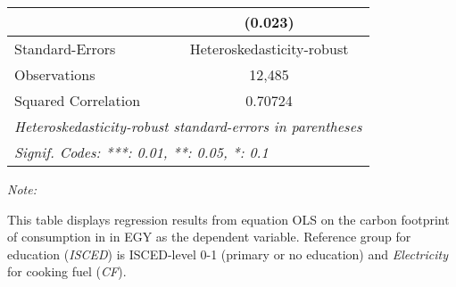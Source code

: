 \begin{table}[htbp!]
\begin{adjustbox}{width = 1\textwidth, max height = 0.95\textheight, center}
\begin{threeparttable}[b]
\begin{tabular}{lc}
                                & (0.023)\\   
            \midrule 
            Standard-Errors     & Heteroskedasticity-robust \\   
            Observations        & 12,485\\  
            Squared Correlation & 0.70724\\  
            \midrule \midrule
            \multicolumn{2}{l}{\emph{Heteroskedasticity-robust standard-errors in parentheses}}\\
            \multicolumn{2}{l}{\emph{Signif. Codes: ***: 0.01, **: 0.05, *: 0.1}}\\
         \end{tabular}
         
         \begin{tablenotes}\item \medskip \textit{Note:}
            \item This table displays regression results from equation OLS on the carbon footprint of consumption in  in EGY as the dependent variable.  Reference group for education (\textit{ISCED}) is ISCED-level 0-1 (primary or no education) and \textit{Electricity} for cooking fuel (\textit{CF}).
         \end{tablenotes}
      \end{threeparttable}
   \end{adjustbox}
\end{table}


